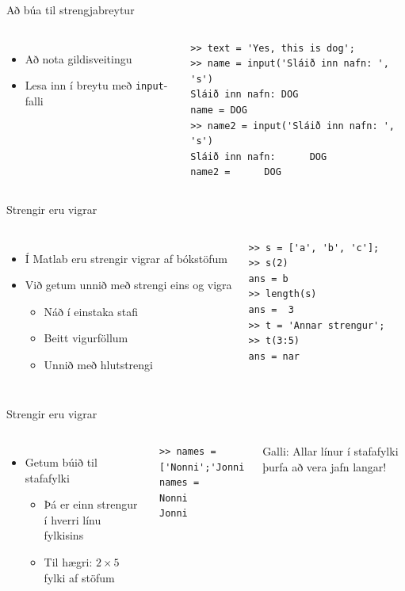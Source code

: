 \documentclass{beamer}
\begin{document}
\begin{frame}[fragile]{Að búa til strengjabreytur}
\begin{columns}
\begin{itemize}
 \item Að nota gildisveitingu
 \item Lesa inn í breytu með \texttt{input}-falli
\end{itemize}\pause
{}
\begin{verbatim}
>> text = 'Yes, this is dog';
>> name = input('Sláið inn nafn: ', 's')
Sláið inn nafn: DOG
name = DOG
>> name2 = input('Sláið inn nafn: ', 's')
Sláið inn nafn:      DOG
name2 =      DOG
\end{verbatim}
\end{columns}
\end{frame}

\begin{frame}[fragile]{Strengir eru vigrar}
\begin{columns}
\begin{itemize}
 \item Í Matlab eru strengir vigrar af bókstöfum
 \item Við getum unnið með strengi eins og vigra
 \begin{itemize}
  \item Náð í einstaka stafi
  \item Beitt vigurföllum
  \item Unnið með hlutstrengi
 \end{itemize}

\end{itemize}
\pause
{}
\begin{verbatim}
>> s = ['a', 'b', 'c'];
>> s(2)
ans = b
>> length(s)
ans =  3
>> t = 'Annar strengur';
>> t(3:5)
ans = nar
\end{verbatim}
\end{columns}
\end{frame}

\begin{frame}[fragile]{Strengir eru vigrar}
\begin{columns}
\begin{itemize}
 \item Getum búið til stafafylki
 \begin{itemize}
  \item Þá er einn strengur í hverri línu fylkisins
  \item Til hægri: $2 \times 5$ fylki af stöfum
 \end{itemize}
\end{itemize}

\begin{verbatim}
>> names = ['Nonni';'Jonni']
names =
Nonni
Jonni
\end{verbatim}
\pause
Galli: Allar línur í stafafylki þurfa að vera jafn langar!
\end{columns}
\end{frame}
\end{document}
